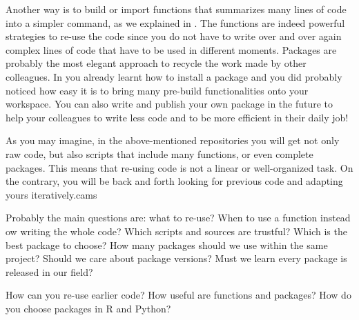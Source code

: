 Another way is to build or import functions that summarizes many lines of code into a simpler command, as we explained in . The functions are indeed powerful strategies to re-use the code since you do not have to write over and over again complex lines of code that have to be used in different moments. Packages are probably the most elegant approach to recycle the work made by other colleagues. In  you already learnt how to install a package and you did probably noticed how easy it is to bring many pre-build functionalities onto your workspace. You can also write and publish your own package in the future to help your colleagues to write less code and to be more efficient in their daily job!

As you may imagine, in the above-mentioned repositories you will get not only raw code, but also scripts that include many functions, or even complete packages. This means that re-using code is not a linear or well-organized task. On the contrary, you will be back and forth looking for previous code and adapting yours iteratively.cams

Probably the main questions are: what to re-use? When to use a function instead ow writing the whole code? Which scripts and sources are trustful? Which is the best package to choose? How many packages should we use within the same project? Should we care about package versions? Must we learn every package is released in our field?

How can you re-use earlier code? How useful are functions and packages? How do you choose packages in R and Python?